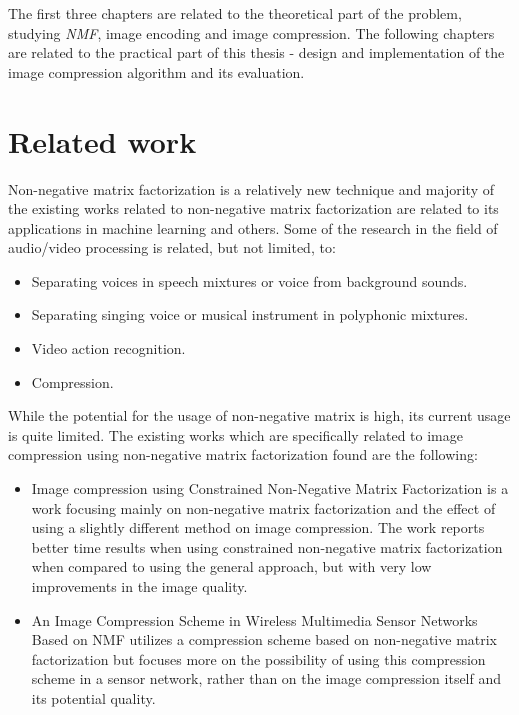 \documentclass[thesis=M,english]{FITthesis}[2012/10/20]
\begin{document}
The first three chapters are related to the theoretical part of the problem, studying
\emph{NMF}, image encoding and image compression. The following chapters are related
to the practical part of this thesis - design and implementation of the image
compression algorithm and its evaluation.


\section{Related work}
Non-negative matrix factorization is a relatively new technique and majority of
the existing works related to non-negative matrix factorization are related to
its applications in machine learning and others. Some of the research in the field
of audio/video processing is related, but not limited, to:
\begin{itemize}
  \item Separating voices in speech mixtures or voice from background sounds. \cite{audioseparate}
  \item Separating singing voice or musical instrument in polyphonic mixtures. \cite{audioseparate2}
  \item Video action recognition. \cite{videorecognition}
  \item Compression.
\end{itemize}

While the potential for the usage of non-negative matrix is high, its current usage
is quite limited. The existing works which are specifically related to image compression
using non-negative matrix factorization found are the following:
\begin{itemize}
  \item Image compression using Constrained Non-Negative Matrix Factorization \cite{imgcnmf}
  is a work focusing mainly on non-negative matrix factorization and the effect of using
  a slightly different method on image compression. The work reports better time results when using constrained
  non-negative matrix factorization when compared to using the general approach, but with very low improvements
  in the image quality.
  \item An Image Compression Scheme in Wireless Multimedia Sensor Networks Based on NMF \cite{wirelessnmf}
  utilizes a compression scheme based on non-negative matrix factorization but focuses more on
  the possibility of using this compression scheme in a sensor network, rather than on the
  image compression itself and its potential quality.
\end{itemize}
\end{document}
